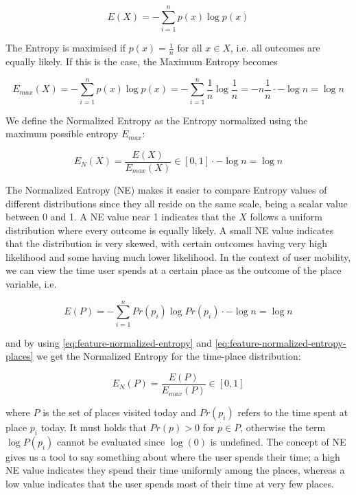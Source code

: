\begin{equation}
\label{eq:feature-entropy}
E(X) = -\sum_{i=1}^{n} p(x) \log p(x)
\end{equation}

The Entropy is maximised if $p(x) = \frac{1}{n}$ for all $x \in X$, i.e. all outcomes are equally likely. If this is the case, the Maximum Entropy becomes 

\begin{equation}
\label{eq:feature-entropy-max}
E_{max}(X) = - \sum_{i=1}^{n} p(x) \log p(x) = - \sum_{i=1}^{n} \frac{1}{n} \log \frac{1}{n} = -n \frac{1}{n} \cdot -\log n = \log n 
\end{equation}

We define the Normalized Entropy as the Entropy normalized using the maximum possible entropy $E_{max}$:

\begin{equation}
\label{eq:feature-normalized-entropy}
E_N(X) = \frac{E(X)}{E_{max}(X)} \in [0,1]
\cdot -\log n = \log n 
\end{equation}

The Normalized Entropy (NE) makes it easier to compare Entropy values of different distributions since they all reside on the same scale, being a scalar value between  0 and 1. A NE value near 1 indicates that the $X$ follows a uniform distribution where every outcome is equally likely. A small NE value indicates that the distribution is very skewed, with certain outcomes having very high likelihood and some having much lower likelihood.  In the context of user mobility, we can view the time user spends at a certain place as the outcome of the place variable, i.e. 

\begin{equation}
\label{eq:feature-normalized-entropy-places}
E(P) = - \sum_{i=1}^{n} Pr(p_i) \log Pr(p_i)
\cdot -\log n = \log n 
\end{equation}

and by using \eqref{eq:feature-normalized-entropy} and \eqref{eq:feature-normalized-entropy-places} we get the Normalized Entropy for the time-place distribution:

\begin{equation}
\label{eq:feature-normalized-entropy}
E_N(P) = \frac{E(P)}{E_{max}(P)} \in [0,1]
\end{equation}

where $P$ is the set of places visited today and $Pr(p_i)$ refers to the time spent at place $p_i$ today. It must holds that $Pr(p) > 0$ for $p \in P$, otherwise the term $\log P(p_i)$ cannot be evaluated since $\log(0)$ is undefined. The concept of NE gives us a tool to say something about where the user spends their time; a high NE value indicates they spend their time uniformly among the places, whereas a low value indicates that the user spends most of their time at very few places. 


